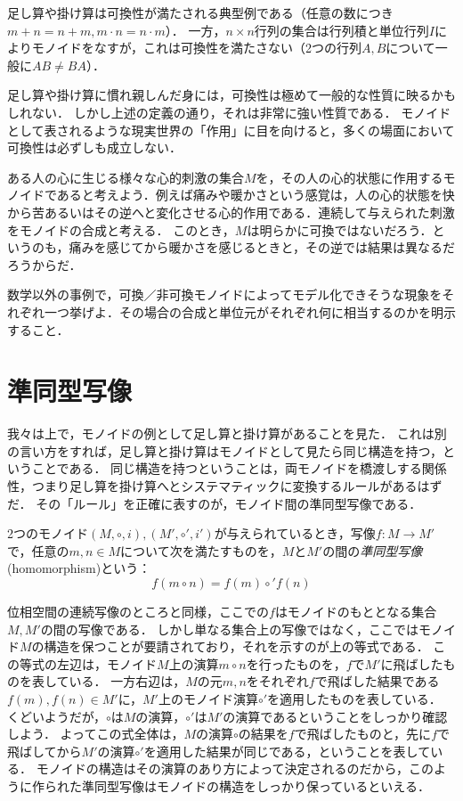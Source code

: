 \documentclass[11pt,a4paper,uplatex]{jsarticle}
\begin{document}
\begin{example}
    足し算や掛け算は可換性が満たされる典型例である（任意の数につき$m+n = n+m, m\cdot n = n\cdot m$）．
    一方，$n \times n$行列の集合は行列積と単位行列$I$によりモノイドをなすが，これは可換性を満たさない（2つの行列$A, B$について一般に$AB \neq BA$）．
\end{example}

足し算や掛け算に慣れ親しんだ身には，可換性は極めて一般的な性質に映るかもしれない．
しかし上述の定義の通り，それは非常に強い性質である．
モノイドとして表されるような現実世界の「作用」に目を向けると，多くの場面において可換性は必ずしも成立しない．


\begin{example}
    ある人の心に生じる様々な心的刺激の集合$M$を，その人の心的状態に作用するモノイドであると考えよう．例えば痛みや暖かさという感覚は，人の心的状態を快から苦あるいはその逆へと変化させる心的作用である．連続して与えられた刺激をモノイドの合成と考える．
    このとき，$M$は明らかに可換ではないだろう．というのも，痛みを感じてから暖かさを感じるときと，その逆では結果は異なるだろうからだ．
\end{example}

\begin{exercise}
    数学以外の事例で，可換／非可換モノイドによってモデル化できそうな現象をそれぞれ一つ挙げよ．その場合の合成と単位元がそれぞれ何に相当するのかを明示すること．
\end{exercise}    


\section{準同型写像}
我々は上で，モノイドの例として足し算と掛け算があることを見た．
これは別の言い方をすれば，足し算と掛け算はモノイドとして見たら同じ構造を持つ，ということである．
同じ構造を持つということは，両モノイドを橋渡しする関係性，つまり足し算を掛け算へとシステマティックに変換するルールがあるはずだ．
その「ルール」を正確に表すのが，モノイド間の準同型写像である．

\begin{dfn}[準同型]
    2つのモノイド$(M, \circ, i), (M', \circ', i')$が与えられているとき，写像$f:M \to M'$で，任意の$m,n \in M$について次を満たすものを，$M$と$M'$の間の\emph{準同型写像}(homomorphism)という：
    \[f(m \circ n) = f(m) \circ' f(n)\]
\end{dfn}

位相空間の連続写像のところと同様，ここでの$f$はモノイドのもととなる集合$M,M'$の間の写像である．
しかし単なる集合上の写像ではなく，ここではモノイド$M$の構造を保つことが要請されており，それを示すのが上の等式である．
この等式の左辺は，モノイド$M$上の演算$m \circ n$を行ったものを，$f$で$M'$に飛ばしたものを表している．
一方右辺は，$M$の元$m,n$をそれぞれ$f$で飛ばした結果である$f(m), f(n) \in M'$に，$M'$上のモノイド演算$\circ'$を適用したものを表している．
くどいようだが，$\circ$は$M$の演算，$\circ'$は$M'$の演算であるということをしっかり確認しよう．
よってこの式全体は，$M$の演算$\circ$の結果を$f$で飛ばしたものと，先に$f$で飛ばしてから$M'$の演算$\circ'$を適用した結果が同じである，ということを表している．
モノイドの構造はその演算のあり方によって決定されるのだから，このように作られた準同型写像はモノイドの構造をしっかり保っているといえる．
\end{document}
